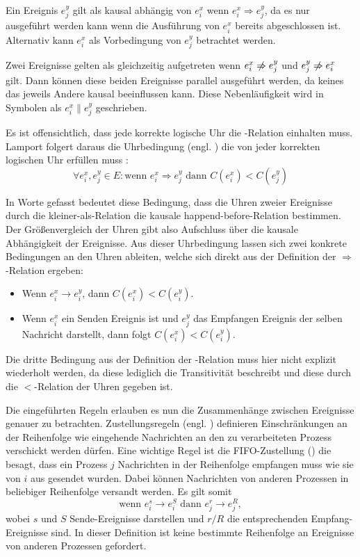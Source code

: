Ein Ereignis $e_j^y$ gilt als kausal abhängig von $e_i^x$ wenn $e_i^x \Rightarrow e_j^y$, da es nur ausgeführt werden kann wenn die Ausführung von $e_i^x$ bereits abgeschlossen ist.
Alternativ kann $e_i^x$ als Vorbedingung von $e_j^y$ betrachtet werden.

Zwei Ereignisse gelten als gleichzeitig aufgetreten wenn $e_i^x \centernot\Rightarrow e_j^y$ und $e_j^y \centernot\Rightarrow e_i^x$ gilt.
Dann können diese beiden Ereignisse parallel ausgeführt werden, da keines das jeweils Andere kausal beeinflussen kann.
Diese Nebenläufigkeit wird in Symbolen als $e_i^x \parallel e_j^y$ geschrieben.

Es ist offensichtlich, dass jede korrekte logische Uhr die -Relation einhalten muss.
Lamport folgert daraus die Uhrbedingung (engl. ) die von jeder korrekten logischen Uhr erfüllen muss \cite{Lamport1978}:
\begin{equation*}
\forall e_i^x, e_j^y \in E \colon \text{wenn } e_i^x \Rightarrow e_j^y \text{ dann } C(e_i^x) < C(e_j^y)
\end{equation*}

In Worte gefasst bedeutet diese Bedingung, dass die Uhren zweier Ereignisse durch die kleiner-als-Relation die kausale happend-before-Relation bestimmen.
Der Größenvergleich der Uhren gibt also Aufschluss über die kausale Abhängigkeit der Ereignisse.
Aus dieser Uhrbedingung lassen sich zwei konkrete Bedingungen an den Uhren ableiten, welche sich direkt aus der Definition der $\Rightarrow$-Relation ergeben:
\begin{itemize}
    \item Wenn $e_i^x \rightarrow e_i^y$, dann $C(e_i^x) < C(e_i^y)$.
    \item Wenn $e_i^x$ ein Senden Ereignis ist und $e_j^y$ das Empfangen Ereignis der selben Nachricht darstellt, dann folgt $C(e_i^x) < C(e_i^y)$.
\end{itemize}

Die dritte Bedingung aus der Definition der -Relation muss hier nicht explizit wiederholt werden, da diese lediglich die Transitivität beschreibt und diese durch die $<$-Relation der Uhren gegeben ist.

Die eingeführten Regeln erlauben es nun die Zusammenhänge zwischen Ereignisse genauer zu betrachten.
Zustellungsregeln (engl. ) definieren Einschränkungen an der Reihenfolge wie eingehende Nachrichten an den zu verarbeiteten Prozess verschickt werden dürfen.
Eine wichtige Regel ist die FIFO-Zustellung () die besagt, dass ein Prozess $j$ Nachrichten in der Reihenfolge empfangen muss wie sie von $i$ aus gesendet wurden.
Dabei können Nachrichten von anderen Prozessen in beliebiger Reihenfolge versandt werden.
Es gilt somit
\begin{equation*}
    \text{wenn } e_i^s \rightarrow e_i^S \text{ dann } e_j^r \rightarrow e_j^R,
\end{equation*}
wobei $s$ und $S$ Sende-Ereignisse darstellen und $r/R$ die entsprechenden Empfang-Ereignisse sind.
In dieser Definition ist keine bestimmte Reihenfolge an Ereignisse von anderen Prozessen gefordert.

